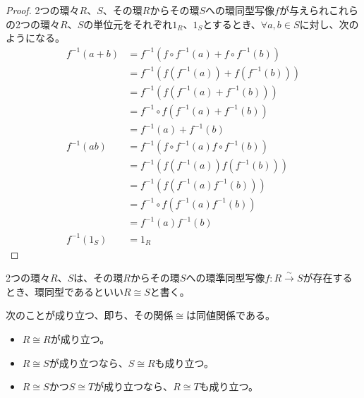 \documentclass[dvipdfmx]{jsarticle}
\begin{document}
\begin{proof}
2つの環々$R$、$S$、その環$R$からその環$S$への環同型写像$f$が与えられこれらの2つの環々$R$、$S$の単位元をそれぞれ$1_{R}$、$1_{S}$とするとき、$\forall a,b \in S$に対し、次のようになる。
\begin{align*}
f^{- 1}(a + b) &= f^{- 1}\left( f \circ f^{- 1}(a) + f \circ f^{- 1}(b) \right)\\
&= f^{- 1}\left( f\left( f^{- 1}(a) \right) + f\left( f^{- 1}(b) \right) \right)\\
&= f^{- 1}\left( f\left( f^{- 1}(a) + f^{- 1}(b) \right) \right)\\
&= f^{- 1} \circ f\left( f^{- 1}(a) + f^{- 1}(b) \right)\\
&= f^{- 1}(a) + f^{- 1}(b)\\
f^{- 1}(ab) &= f^{- 1}\left( f \circ f^{- 1}(a)f \circ f^{- 1}(b) \right)\\
&= f^{- 1}\left( f\left( f^{- 1}(a) \right)f\left( f^{- 1}(b) \right) \right)\\
&= f^{- 1}\left( f\left( f^{- 1}(a)f^{- 1}(b) \right) \right)\\
&= f^{- 1} \circ f\left( f^{- 1}(a)f^{- 1}(b) \right)\\
&= f^{- 1}(a)f^{- 1}(b)\\
f^{- 1}\left( 1_{S} \right) &= 1_{R}
\end{align*}
\end{proof}
\begin{dfn}
2つの環々$R$、$S$は、その環$R$からその環$S$への環準同型写像$f:R\overset{\sim}{\rightarrow}S$が存在するとき、環同型であるといい$R \cong S$と書く。
\end{dfn}
\begin{thm}\label{3.3.2.16}
次のことが成り立つ、即ち、その関係$\cong$は同値関係である。
\begin{itemize}
\item
  $R \cong R$が成り立つ。
\item
  $R \cong S$が成り立つなら、$S \cong R$も成り立つ。
\item
  $R \cong S$かつ$S \cong T$が成り立つなら、$R \cong T$も成り立つ。
\end{itemize}
\end{thm}
\end{document}
